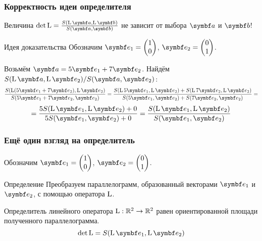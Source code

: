 \begin{frame}
    \frametitle{Корректность идеи определителя}

    Величина $\det \LL = \frac{S(\LL\ba, \LL\bb)}{S(\ba, \bb)}$ не зависит от выбора $\ba$ и $\bb$!


    \pause
    \begin{block}{Идея доказательства}
        Обозначим $\be_1 = \begin{pmatrix}
            1 \\
            0 \\
        \end{pmatrix}$, $\be_2 = \begin{pmatrix}
            0 \\
            1 \\
        \end{pmatrix}$.
        \pause

        Возьмём $\ba = 5\be_1 + 7\be_2$. Найдём $S(\LL\ba, \LL\be_2)/{S(\ba, \be_2)}$:
        \pause
        \[
        \frac{S(\LL (5\be_1 + 7\be_2), \LL \be_2)}{S(5\be_1 + 7\be_2,\be_2)} =
         \frac{S(\LL 5\be_1 , \LL \be_2) + S(\LL 7\be_2 , \LL \be_2)}{S(5\be_1,\be_2) + S(7\be_2,\be_2)} =
        \]
        \pause
        \[
         =\frac{5S(\LL \be_1 , \LL \be_2) + 0}{5S(\be_1,\be_2) + 0} =
         \frac{S(\LL \be_1 , \LL \be_2)}{S(\be_1,\be_2)}
        \]
    \end{block}

    

\end{frame}



\begin{frame}
    \frametitle{Ещё один взгляд на определитель}
    
    Обозначим $\be_1 = \begin{pmatrix}
        1 \\
        0 \\
    \end{pmatrix}$, $\be_2 = \begin{pmatrix}
        0 \\
        1 \\
    \end{pmatrix}$.

    \pause

    \begin{block}{Определение}
        Преобразуем параллелограмм, образованный векторами $\be_1$ и $\be_2$, с помощью оператора $\operatorname{L}$. 
        
        Определитель линейного оператора $\operatorname{L}:\mathbb{R}^2 \to \mathbb{R}^2$ равен ориентированной 
        площади полученного параллелограмма.
        \[
        \det \LL = S(\LL\be_1, \LL\be_2)    
        \]
        
    \end{block}
    
\end{frame}


